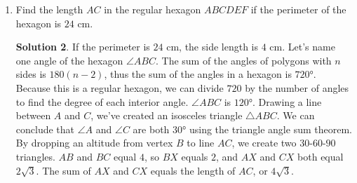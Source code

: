\documentclass{article}
\theoremstyle{definition}
\newtheorem*{solution}{Solution}
\begin{document}
\begin{multicols}{2}
\begin{enumerate}
\begin{solution}
                Since the triangle is isosceles, the altitude $AX$ to side $BC$ bisects $BC$.
                Thus, from the Pythagorean Theorem on the right triangle $ABX$, we find $AX = 30$, so $ABC = \frac{BC \cdot AX}{2} = \frac{80 \cdot 30}{2} = 1200$ squared units.
            \end{solution}
        \item Find the length $AC$ in the regular hexagon $ABCDEF$ if the perimeter of the hexagon is $24$ cm.
            \begin{solution}
                If the perimeter is $24$ cm, the side length is $4$ cm.
                Let's name one angle of the hexagon $\angle ABC$.
                The sum of the angles of polygons with $n$ sides is $180(n - 2)$, thus the sum of the angles in a hexagon is $\ang{720}$.
                Because this is a regular hexagon, we can divide $720$ by the number of angles to find the degree of each interior angle.
                $\angle ABC$ is $\ang{120}$.
                Drawing a line between $A$ and $C$, we've created an isosceles triangle $\triangle ABC$.
                We can conclude that $\angle A$ and $\angle C$ are both $\ang{30}$ using the triangle angle sum theorem.
                By dropping an altitude from vertex $B$ to line $AC$, we create two $30$-$60$-$90$ triangles.
                $AB$ and $BC$ equal $4$, so $BX$ equals $2$, and $AX$ and $CX$ both equal $2\sqrt{3}$.
                The sum of $AX$ and $CX$ equals the length of $AC$, or $4\sqrt{3}$.
            \end{solution}
    \end{enumerate}
\end{multicols}
\end{document}
